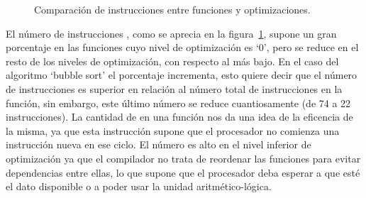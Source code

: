 \begin{figure}[hb]
\begin{center}
\end{center}
\caption{Comparación de instrucciones  entre funciones y optimizaciones.}
\label{graph:nops}
\end{figure}
El número de instrucciones , como se aprecia en la figura~\ref{graph:nops}, supone un gran porcentaje en las funciones cuyo nivel de optimización es `0', pero se reduce en el resto de los niveles de optimización, con respecto al más bajo. En el caso del algoritmo `bubble sort' el porcentaje incrementa, esto quiere decir que el número de instrucciones  es superior en relación al número total de instrucciones en la función, sin embargo, este último número se reduce cuantiosamente (de 74 a 22 instrucciones). La cantidad de  en una función nos da una idea de la eficencia de la misma, ya que esta instrucción supone que el procesador no comienza una instrucción nueva en ese ciclo. El número es alto en el nivel inferior de optimización ya que el compilador no trata de reordenar las funciones para evitar dependencias entre ellas, lo que supone que el procesador deba esperar a que esté el dato disponible o a poder usar la unidad aritmético-lógica.
